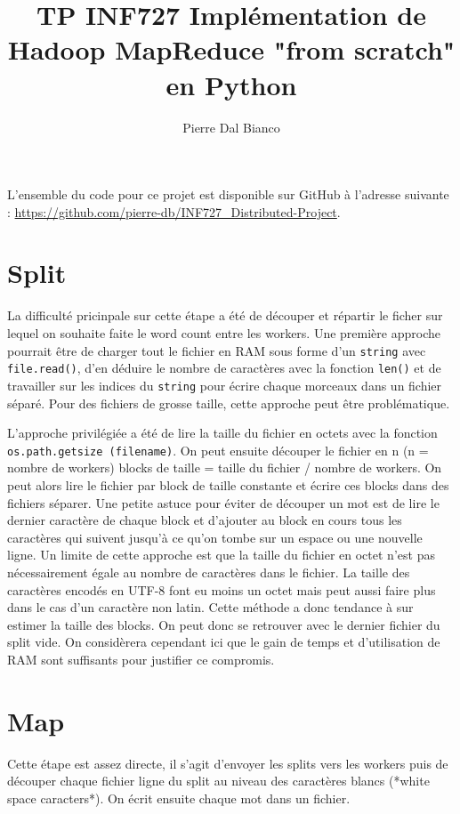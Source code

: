 \documentclass[11pt,a4paper]{article}
\title{TP INF727 \textbf{Implémentation de Hadoop MapReduce "from scratch" en Python}}
\author{Pierre Dal Bianco}
\date{}
\begin{document}
\maketitle
\hrulefill

L'ensemble du code pour ce projet est disponible sur GitHub à l'adresse suivante : \url{https://github.com/pierre-db/INF727_Distributed-Project}.

\section{Split}
La difficulté pricinpale sur cette étape a été de découper et répartir le ficher sur lequel on souhaite faite le word count entre les workers. Une première approche pourrait être de charger tout le fichier en RAM sous forme d'un \texttt{string} avec \texttt{file.read()}, d'en déduire le nombre de caractères avec la fonction \texttt{len()} et de travailler sur les indices du \texttt{string} pour écrire chaque morceaux dans un fichier séparé. Pour des fichiers de grosse taille, cette approche peut être problématique.

L'approche privilégiée a été de lire la taille du fichier en octets avec la fonction \texttt{os.path.getsize (filename)}. On peut ensuite découper le fichier en n (n = nombre de workers) blocks de taille = taille du fichier / nombre de workers. On peut alors lire le fichier par block de taille constante et écrire ces blocks dans des fichiers séparer. Une petite astuce pour éviter de découper un mot est de lire le dernier caractère de chaque block et d'ajouter au block en cours tous les caractères qui suivent jusqu'à ce qu'on tombe sur un espace ou une nouvelle ligne. Un limite de cette approche est que la taille du fichier en octet n'est pas nécessairement égale au nombre de caractères dans le fichier. La taille des caractères encodés en UTF-8 font eu moins un octet mais peut aussi faire plus dans le cas d'un caractère non latin. Cette méthode a donc tendance à sur estimer la taille des blocks. On peut donc se retrouver avec le dernier fichier du split vide. On considèrera cependant ici que le gain de temps et d'utilisation de RAM sont suffisants pour justifier ce compromis.

\section{Map}
Cette étape est assez directe, il s'agit d'envoyer les splits vers les workers puis de découper chaque fichier ligne du split au niveau des caractères blancs (*white space caracters*). On écrit ensuite chaque mot dans un fichier.
\end{document}

